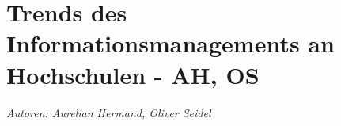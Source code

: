 \chapter{Trends des Informationsmanagements an Hochschulen - AH, OS}
\textit{Autoren: Aurelian Hermand, Oliver Seidel}




